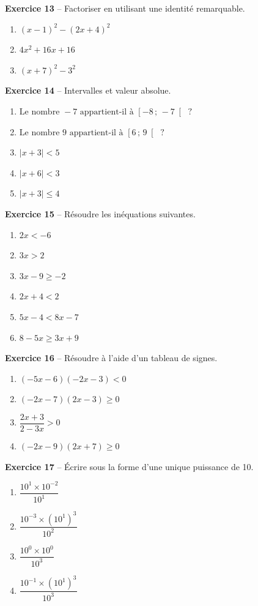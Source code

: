\documentclass[12pt,a4paper,french]{article}
\begin{document}
\noindent\textbf{Exercice 13} -- Factoriser en utilisant une identité remarquable.
\begin{enumerate}
\item $(x - 1)^2 - (2x + 4)^2$
\item $4x^2 + 16x + 16$
\item $(x + 7)^2 - 3^2$
\end{enumerate}
\bigskip

\noindent\textbf{Exercice 14} -- Intervalles et valeur absolue.
\begin{enumerate}
\item $\text{Le nombre } -7 \text{ appartient-il à } \left[ -8 \,;\, -7 \right[ \text{ ?}$
\item $\text{Le nombre } 9 \text{ appartient-il à } \left[ 6 \,;\, 9 \right[ \text{ ?}$
\item $|x + 3| < 5$
\item $|x + 6| < 3$
\item $|x + 3| \leqslant 4$
\end{enumerate}
\bigskip

\noindent\textbf{Exercice 15} -- Résoudre les inéquations suivantes.
\begin{enumerate}
\item $2 x < -6$
\item $3 x > 2$
\item $3 x - 9 \geq -2$
\item $2 x + 4 < 2$
\item $5 x - 4 < 8 x - 7$
\item $8 - 5 x \geq 3 x + 9$
\end{enumerate}
\bigskip

\noindent\textbf{Exercice 16} -- Résoudre à l'aide d'un tableau de signes.
\begin{enumerate}
\item $\left(- 5 x - 6\right) \left(- 2 x - 3\right) < 0$
\item $\left(- 2 x - 7\right) \left(2 x - 3\right) \geq 0$
\item $\dfrac{2 x + 3}{2 - 3 x} > 0$
\item $\left(- 2 x - 9\right) \left(2 x + 7\right) \geq 0$
\end{enumerate}
\bigskip

\noindent\textbf{Exercice 17} -- Écrire sous la forme d'une unique puissance de 10.
\begin{enumerate}
\item $\dfrac{10^{1} \times 10^{-2}}{10^{1}}$
\item $\dfrac{10^{-3} \times (10^{1})^{3}}{10^{2}}$
\item $\dfrac{10^{0} \times 10^{0}}{10^{3}}$
\item $\dfrac{10^{-1} \times (10^{1})^{3}}{10^{3}}$
\end{enumerate}
\bigskip
\end{document}
